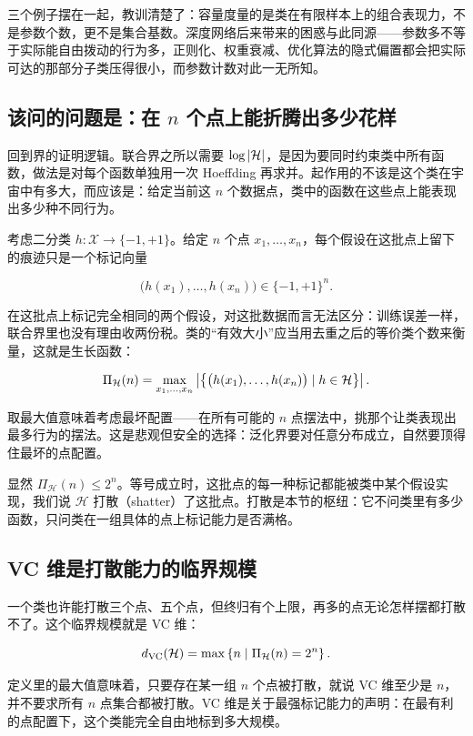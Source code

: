 三个例子摆在一起，教训清楚了：容量度量的是类在有限样本上的组合表现力，不是参数个数，更不是集合基数。深度网络后来带来的困惑与此同源——参数多不等于实际能自由拨动的行为多，正则化、权重衰减、优化算法的隐式偏置都会把实际可达的那部分子类压得很小，而参数计数对此一无所知。

\subsection{该问的问题是：在 \(n\) 个点上能折腾出多少花样}

回到界的证明逻辑。联合界之所以需要 \(\log\left|\mathcal{H}\right|\)，是因为要同时约束类中所有函数，做法是对每个函数单独用一次 Hoeffding 再求并。起作用的不该是这个类在宇宙中有多大，而应该是：给定当前这 \(n\) 个数据点，类中的函数在这些点上能表现出多少种不同行为。

考虑二分类 \(h:\mathcal{X}\to\{-1,+1\}\)。给定 \(n\) 个点 \(x_1,\dots,x_n\)，每个假设在这批点上留下的痕迹只是一个标记向量

\[
\bigl(h(x_1),\dots,h(x_n)\bigr)\in\{-1,+1\}^n.
\]

在这批点上标记完全相同的两个假设，对这批数据而言无法区分：训练误差一样，联合界里也没有理由收两份税。类的``有效大小''应当用去重之后的等价类个数来衡量，这就是生长函数：

\[
\Pi_{\mathcal{H}}(n)
= \max_{x_1,\dots,x_n}
\left|\bigl\{\bigl(h(x_1),\dots,h(x_n)\bigr)\mid h\in\mathcal{H}\bigr\}\right|.
\]

取最大值意味着考虑最坏配置——在所有可能的 \(n\) 点摆法中，挑那个让类表现出最多行为的摆法。这是悲观但安全的选择：泛化界要对任意分布成立，自然要顶得住最坏的点配置。

显然 \(\Pi_{\mathcal{H}}(n)\le 2^n\)。等号成立时，这批点的每一种标记都能被类中某个假设实现，我们说 \(\mathcal{H}\) 打散（shatter）了这批点。打散是本节的枢纽：它不问类里有多少函数，只问类在一组具体的点上标记能力是否满格。

\subsection{VC 维是打散能力的临界规模}

一个类也许能打散三个点、五个点，但终归有个上限，再多的点无论怎样摆都打散不了。这个临界规模就是 VC 维：

\[
d_{\mathrm{VC}}(\mathcal{H})
= \max\left\{n \mid \Pi_{\mathcal{H}}(n)=2^n\right\}.
\]

定义里的最大值意味着，只要存在某一组 \(n\) 个点被打散，就说 VC 维至少是 \(n\)，并不要求所有 \(n\) 点集合都被打散。VC 维是关于最强标记能力的声明：在最有利的点配置下，这个类能完全自由地标到多大规模。

